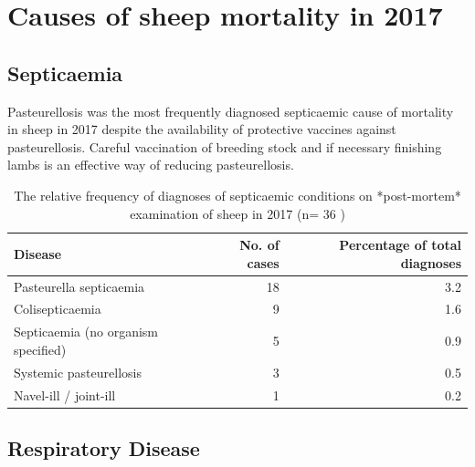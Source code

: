 \documentclass[]{book}
\begin{document}
\section{Causes of sheep mortality in
2017}\label{causes-of-sheep-mortality-in-2017}

\subsection{Septicaemia}\label{septicaemia}

Pasteurellosis was the most frequently diagnosed septicaemic cause of
mortality in sheep in 2017 despite the availability of protective
vaccines against pasteurellosis. Careful vaccination of breeding stock
and if necessary finishing lambs is an effective way of reducing
pasteurellosis.

\begin{table}

\caption{\label{tab:unnamed-chunk-83}The relative frequency of diagnoses of septicaemic conditions on *post-mortem* examination of sheep in 2017 (n= 36 )}
\centering
\begin{tabular}[t]{l|r|r}
\hline
Disease & No. of cases & Percentage of total diagnoses\\
\hline
Pasteurella septicaemia & 18 & 3.2\\
\hline
Colisepticaemia & 9 & 1.6\\
\hline
Septicaemia (no organism specified) & 5 & 0.9\\
\hline
Systemic pasteurellosis & 3 & 0.5\\
\hline
Navel-ill / joint-ill & 1 & 0.2\\
\hline
\end{tabular}
\end{table}

\subsection{Respiratory Disease}\label{respiratory-disease}
\end{document}
